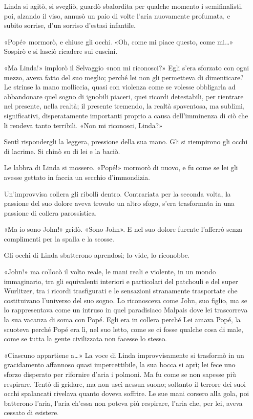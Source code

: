 \documentclass[
a5paper, %
10pt, %
twoside, 
onecolumn, %
openany, %
]{memoir}
\begin{document}
Linda si agitò, si svegliò, guardò sbalordita per qualche momento i semifinalisti, poi, alzando il viso, annusò un paio di volte l’aria nuovamente profumata, e subito sorrise, d’un sorriso d’estasi infantile.

«Popé» mormorò, e chiuse gli occhi. «Oh, come mi piace questo, come mi…» Sospirò e si lasciò ricadere sui cuscini.

«Ma Linda!» implorò il Selvaggio «non mi riconosci?» Egli s’era sforzato con ogni mezzo, aveva fatto del suo meglio; perché lei non gli permetteva di dimenticare? Le strinse la mano molliccia, quasi con violenza come se volesse obbligarla ad abbandonare quel sogno di ignobili piaceri, quei ricordi detestabili, per rientrare nel presente, nella realtà; il presente tremendo, la realtà spaventosa, ma sublimi, significativi, disperatamente importanti proprio a causa dell’imminenza di ciò che li rendeva tanto terribili. «Non mi riconosci, Linda?»

Sentì rispondergli la leggera, pressione della sua mano. Gli si riempirono gli occhi di lacrime. Si chinò su di lei e la baciò.

Le labbra di Linda si mossero. «Popé!» mormorò di nuovo, e fu come se lei gli avesse gettato in faccia un secchio d’immondizia.

Un’improvvisa collera gli ribollì dentro. Contrariata per la seconda volta, la passione del suo dolore aveva trovato un altro sfogo, s’era trasformata in una passione di collera parossistica.

«Ma io sono John!» gridò. «Sono John». E nel suo dolore furente l’afferrò senza complimenti per la spalla e la scosse.

Gli occhi di Linda sbatterono aprendosi; lo vide, lo riconobbe.

«John!» ma collocò il volto reale, le mani reali e violente, in un mondo immaginario, tra gli equivalenti interiori e particolari del patchouli e del super Wurlitzer, tra i ricordi trasfigurati e le sensazioni stranamente trasportate che costituivano l’universo del suo sogno. Lo riconosceva come John, suo figlio, ma se lo rappresentava come un intruso in quel paradisiaco Malpais dove lei trascorreva la sua vacanza di soma con Popé. Egli era in collera perché Lei amava Popé, la scuoteva perché Popé era lì, nel suo letto, come se ci fosse qualche cosa di male, come se tutta la gente civilizzata non facesse lo stesso.

«Ciascuno appartiene a…» La voce di Linda improvvisamente si trasformò in un gracidamento affannoso quasi impercettibile, la sua bocca si aprì; lei fece uno sforzo disperato per rifornire d’aria i polmoni. Ma fu come se non sapesse più respirare. Tentò di gridare, ma non uscì nessun suono; soltanto il terrore dei suoi occhi spalancati rivelava quanto doveva soffrire. Le sue mani corsero alla gola, poi batterono l’aria, l’aria ch’essa non poteva più respirare, l’aria che, per lei, aveva cessato di esistere.
\end{document}
